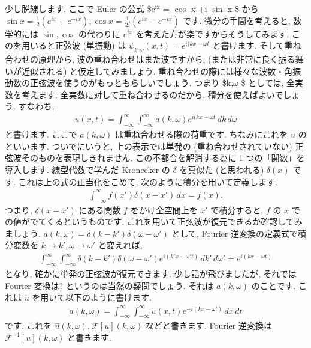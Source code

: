 \documentclass[openany, a4paper, oneside]{jsbook}
\theoremstyle{break}
\theoremstyle{breakdefn}
\begin{document}
少し脱線します. ここで Euler の公式
\$e$^{\mathrm{ix}}$ = $\cos$ x +i $\sin$ x \$
から
$\sin x = \frac{1} {2} ( e^{ix} + e^{-ix} ),\cos x = \frac{1} {2i} ( e^{ix} - e^{-ix} )$
です.
微分の手間を考えると, 数学的には $\sin,\cos$ の代わりに $e^{ix}$ を考えた方が楽ですからそうしてみます.
このを用いると正弦波 (単振動) は
$\psi _{k , \omega } (x,t) = e^{i (kx - \omega t}$
と書けます.
そして重ね合わせの原理から, 波の重ね合わせはまた波ですから,
(または非常に良く振る舞いが近似される) と仮定してみましょう.
重ね合わせの際には様々な波数・角振動数の正弦波を使うのがもっともらしいでしょう.
つまり \$k,$\omega$ \$ としては, 全実数を考えます.
全実数に対して重ね合わせるのだから, 積分を使えばよいでしょう. すなわち,
\begin{align}
u (x,t)
=
\int _{-\infty} ^{\infty} \int _{-\infty} ^{\infty} a (k , \omega ) e^{i (kx - \omega t} \, d k \, d\omega
\end{align}
と書けます.
ここで $a (k,\omega)$ は重ね合わせる際の荷重です.
ちなみにこれを $u$ のといいます.
ついでにいうと, 上の表示では単発の (重ね合わせされていない) 正弦波そのものを表現しきれません.
この不都合を解消する為に 1 つの「関数」を導入します. 線型代数で学んだ Kronecker の $\delta$ を真似た (と思われる)
$\delta (x)$ です. これは上の式の正当化をこめて, 次のように積分を用いて定義します.
\begin{align}
\int _{-\infty} ^{\infty} f (x') \delta (x - x' ) \, dx
=
f (x).
\end{align}
つまり,
$\delta (x - x')$
にある関数 $f$ をかけ全空間上を $x'$ で積分すると,  $f$ の $x$ での値がでてくるというものです.
これを用いて正弦波が復元できるか確認してみましょう.
$a (k, \omega) = \delta (k-k') \delta (\omega - \omega ' )$ として,
Fourier 逆変換の定義式で積分変数を $k\to k', \omega \to \omega '$ と変えれば,
\begin{align}
\int _{-\infty} ^{\infty} \int _{-\infty} ^{\infty}
\delta (k-k') \delta (\omega - \omega ' ) e^{i (k' x - \omega' t)} \, d k' \, d\omega '
=
e^{i (kx - \omega t)}
\end{align}
となり, 確かに単発の正弦波が復元できます.
少し話が飛びましたが, それでは Fourier 変換は? というのは当然の疑問でしょう.
それは $a (k,\omega )$ のことです. これは $u$ を用いて以下のように書けます.
\begin{align}
a (k , \omega )
=
\int _{-\infty} ^{\infty}\int _{-\infty} ^{\infty} u (x,t) e^{-i (kx - \omega t)} \, dx \, dt
\end{align}
です. これを $\hat {u} (k,\omega ), \mathcal{F}[u] (k,\omega)$ などと書きます.
Fourier 逆変換は $\mathcal{F}^{-1}[u] (k,\omega)$ と書きます.
\end{document}
